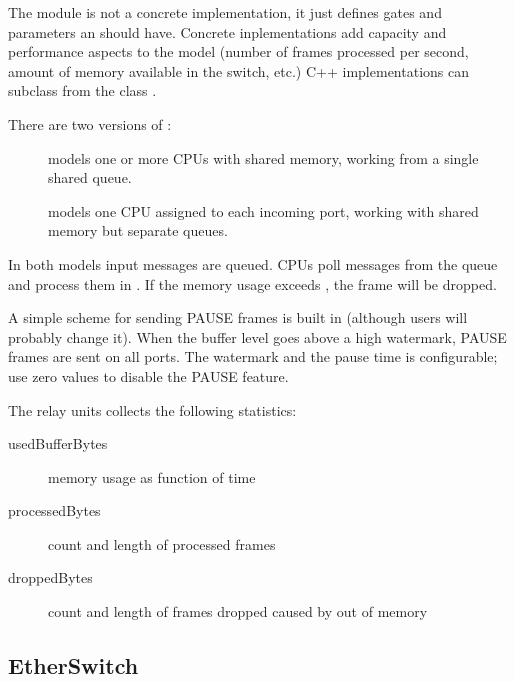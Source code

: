 The  module is not a concrete implementation,
it just defines gates and parameters an  should have.
Concrete inplementations add
capacity and performance aspects to the model (number of frames processed
per second, amount of memory available in the switch, etc.)
C++ implementations can subclass from the class .

There are two versions of :

\begin{description}
  \item[] models one or more CPUs with shared memory,
    working from a single shared queue.
  \item[] models one CPU assigned to each incoming port,
    working with shared memory but separate queues.
\end{description}

In both models input messages are queued. CPUs poll messages from the queue
and process them in . If the memory usage exceeds
, the frame will be dropped.

A simple scheme for sending PAUSE frames is built in (although
users will probably change it). When the buffer level goes
above a high watermark, PAUSE frames are sent on all ports.
The watermark and the pause time is configurable; use zero
values to disable the PAUSE feature.


The relay units collects the following statistics:

\begin{description}
\item[usedBufferBytes] memory usage as function of time
\item[processedBytes] count and length of processed frames
\item[droppedBytes] count and length of frames dropped caused by out of memory
\end{description}


\subsection{EtherSwitch}

